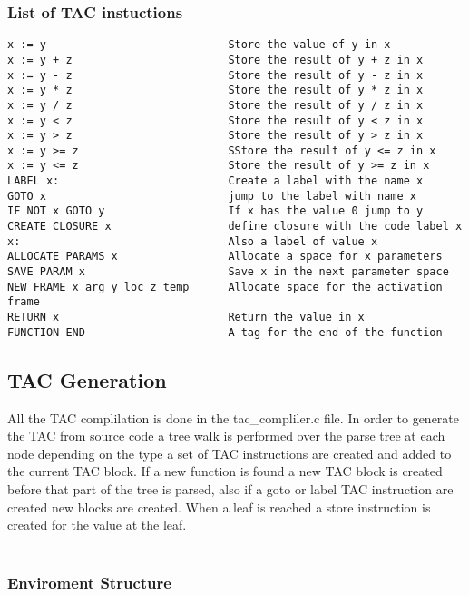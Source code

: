 \documentclass{article}
\begin{document}
\subsubsection{List of TAC instuctions}
\begin{lstlisting}
x := y                            Store the value of y in x
x := y + z                        Store the result of y + z in x
x := y - z                        Store the result of y - z in x
x := y * z                        Store the result of y * z in x
x := y / z                        Store the result of y / z in x
x := y < z                        Store the result of y < z in x
x := y > z                        Store the result of y > z in x
x := y >= z                       SStore the result of y <= z in x
x := y <= z                       Store the result of y >= z in x
LABEL x:                          Create a label with the name x
GOTO x                            jump to the label with name x
IF NOT x GOTO y                   If x has the value 0 jump to y
CREATE CLOSURE x                  define closure with the code label x
x:                                Also a label of value x
ALLOCATE PARAMS x                 Allocate a space for x parameters
SAVE PARAM x                      Save x in the next parameter space
NEW FRAME x arg y loc z temp      Allocate space for the activation frame
RETURN x                          Return the value in x
FUNCTION END                      A tag for the end of the function
\end{lstlisting}


\subsection{TAC Generation}

All the TAC complilation is done in the tac\_compliler.c file.
In order to generate the TAC from source code a tree walk is performed over the
parse tree at each node depending on the type a set of TAC instructions are created
and added to the current TAC block. If a new function is found a new TAC block is
created before that part of the tree is parsed, also if a goto or label TAC instruction
are created new blocks are created. When a leaf is reached a store instruction is
created for the value at the leaf.\\~\\

\subsubsection{Enviroment Structure}
\end{document}
